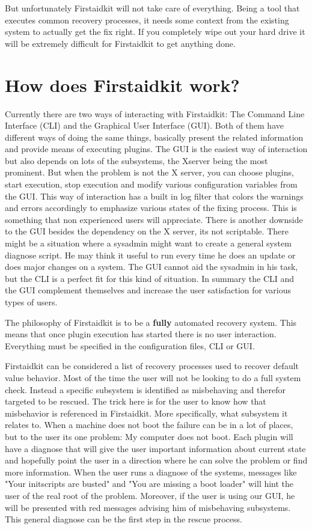 \documentclass[a4paper,13pt]{article}
\begin{document}
But unfortunately Firstaidkit will not take care of everything.  Being a tool that executes common recovery processes, it needs some context from the existing system to actually get the fix right.  If you completely wipe out your hard drive it will be extremely difficult for Firstaidkit to get anything done.

\section{How does Firstaidkit work?}
Currently there are two ways of interacting with Firstaidkit: The Command Line Interface (CLI) and the Graphical User Interface (GUI).  Both of them have different ways of doing the same things, basically present the related information and provide means of executing plugins.  The GUI is the easiest way of interaction but also depends on lots of the subsystems, the Xserver being the most prominent.  But when the problem is not the X server, you can choose plugins, start execution, stop execution and modify various configuration variables from the GUI.  This way of interaction has a built in log filter that colors the warnings and errors accordingly to emphasize various states of the fixing process.  This is something that non experienced users will appreciate.  There is another downside to the GUI besides the dependency on the X server, its not scriptable.  There might be a situation where a sysadmin might want to create a general system diagnose script.  He may think it useful to run every time he does an update or does major changes on a system.  The GUI cannot aid the sysadmin in his task, but the CLI is a perfect fit for this kind of situation.  In summary the CLI and the GUI complement themselves and increase the user satisfaction for various types of users.

The philosophy of Firstaidkit is to be a \textbf{fully} automated recovery system.  This means that once plugin execution has started there is no user interaction.  Everything must be specified in the configuration files, CLI or GUI.

Firstaidkit can be considered a list of recovery processes used to recover default value behavior.  Most of the time the user will not be looking to do a full system check.  Instead a specific subsystem is identified as misbehaving and therefor targeted to be rescued.  The trick here is for the user to know how that misbehavior is referenced in Firstaidkit.  More specifically, what subsystem it relates to.  When a machine does not boot the failure can be in a lot of places, but to the user its one problem: My computer does not boot.  Each plugin will have a diagnose that will give the user important information about current state and hopefully point the user in a direction where he can solve the problem or find more information.  When the user runs a diagnose of the systems, messages like "Your initscripts are busted" and "You are missing a boot loader" will hint the user of the real root of the problem.  Moreover, if the user is using our GUI, he will be presented with red messages advising him of misbehaving subsystems.  This general diagnose can be the first step in the rescue process.
\end{document}
